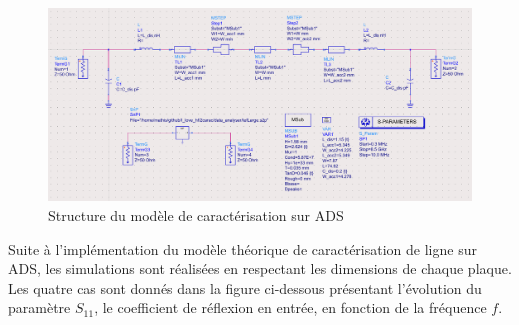 \documentclass[french]{article}
\begin{document}
\begin{figure}[H]
	\centering
	\includegraphics[scale=0.29]{../2carac/caract_large_bande/modele_ADS.png}
	\caption{Structure du modèle de caractérisation sur ADS}
	\label{fig:modele_caract_ADS}
\end{figure}

\newpage

Suite à l'implémentation du modèle théorique de caractérisation de ligne sur ADS, les simulations sont réalisées en respectant les dimensions de chaque plaque. Les quatre cas sont donnés dans la figure ci-dessous présentant l'évolution du paramètre $S_{11}$, le coefficient de réflexion en entrée, en fonction de la fréquence $f$.
\end{document}
